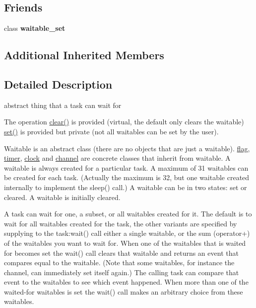 \subsection*{Friends}
\begin{DoxyCompactItemize}
\item 
class {\bfseries waitable\+\_\+set}\hypertarget{classrtos_1_1waitable_a0ee29d8961a0b67cea2c3fa76da116da}{}\label{classrtos_1_1waitable_a0ee29d8961a0b67cea2c3fa76da116da}

\end{DoxyCompactItemize}
\subsection*{Additional Inherited Members}


\subsection{Detailed Description}
abstract thing that a task can wait for 

The operation \hyperlink{classrtos_1_1waitable_a4571df4fc41d342cce418d591e0a9bdd}{clear()} is provided (virtual, the default only clears the waitable) \hyperlink{classrtos_1_1waitable_a6ef912480d9662171607aac42f7e4bbb}{set()} is provided but private (not all waitables can be set by the user).

Waitable is an abstract class (there are no objects that are just a waitable). \hyperlink{classrtos_1_1flag}{flag}, \hyperlink{classrtos_1_1timer}{timer}, \hyperlink{classrtos_1_1clock}{clock} and \hyperlink{classrtos_1_1channel}{channel} are concrete classes that inherit from waitable. A waitable is always created for a particular task. A maximum of 31 waitables can be created for each task. (Actually the maximum is 32, but one waitable created internally to implement the sleep() call.) A waitable can be in two states\+: set or cleared. A waitable is initially cleared.

A task can wait for one, a subset, or all waitables created for it. The default is to wait for all waitables created for the task, the other variants are specified by supplying to the task\+:wait() call either a single waitable, or the sum (operator+) of the waitables you want to wait for. When one of the waitables that is waited for becomes set the wait() call clears that waitable and returns an event that compares equal to the waitable. (Note that some waitables, for instance the channel, can immediately set itself again.) The calling task can compare that event to the waitables to see which event happened. When more than one of the waited-\/for waitables is set the wait() call makes an arbitrary choice from these waitables. 

